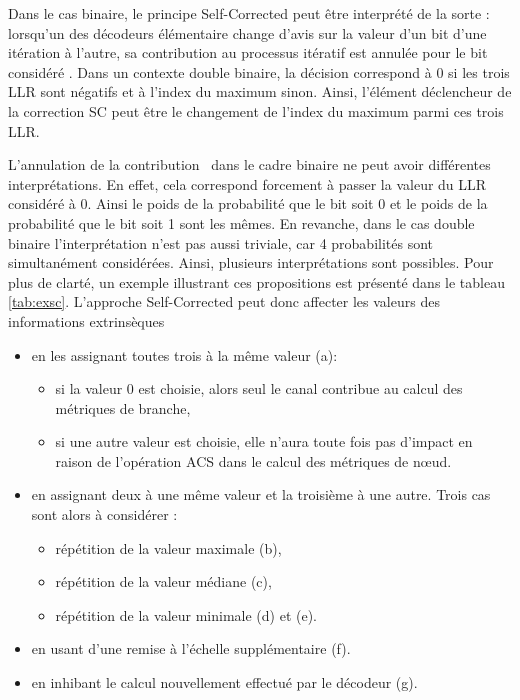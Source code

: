Dans le cas binaire, le principe Self-Corrected peut être interprété de la sorte : \og lorsqu'un des décodeurs élémentaire 
change d'avis sur la valeur d'un bit d'une itération à l'autre, sa contribution au processus itératif est annulée pour 
le bit considéré \fg. Dans un contexte double binaire, la décision correspond à 0 si les trois LLR sont négatifs et à 
l'index du maximum sinon. Ainsi, l'élément déclencheur de la correction SC peut être le changement de l'index du maximum 
parmi ces trois LLR.

\og L'annulation de la contribution \fg ~dans le cadre binaire ne peut avoir différentes interprétations. En effet, cela 
correspond forcement à passer la valeur du LLR considéré à 0. Ainsi le poids de la probabilité que le bit soit 0 et 
le poids de la probabilité que le bit soit 1 sont les mêmes. En revanche, dans le cas double binaire l'interprétation n'est 
pas aussi triviale, car 4 probabilités sont simultanément considérées. Ainsi, plusieurs interprétations sont possibles. Pour plus 
de clarté, un exemple illustrant ces propositions est présenté dans le tableau \ref{tab:exsc}. L'approche Self-Corrected 
peut donc affecter les valeurs des informations extrinsèques 
\begin{itemize}
	\item en les assignant toutes trois à la même valeur (a):
	\begin{itemize}
		\item si la valeur 0 est choisie, alors seul le canal contribue au calcul des métriques de branche,
		\item si une autre valeur est choisie, elle n'aura toute fois pas d'impact en raison de l’opération 
		ACS dans le calcul des métriques de nœud.
	\end{itemize}
	\item en assignant deux à une même valeur et la troisième à une autre. Trois cas sont alors à considérer :
	\begin{itemize}
		\item répétition de la valeur maximale (b),
		\item répétition de la valeur médiane (c),
		\item répétition de la valeur minimale (d) et (e).
	\end{itemize}
	\item en usant d'une remise à l'échelle supplémentaire (f).
	\item en inhibant le calcul nouvellement effectué par le décodeur (g).\\
\end{itemize}

